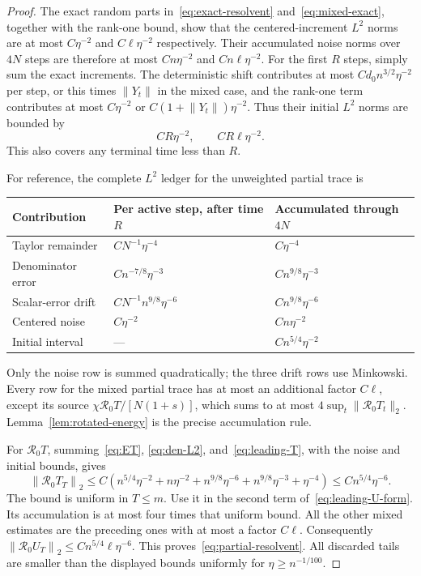 \documentclass[11pt]{article}
\theoremstyle{definition}\newtheorem{definition}[theorem]{Definition}
\theoremstyle{remark}\newtheorem{remark}[theorem]{Remark}
\newcommand{\R}{\mathcal R}
\newcommand{\norm}[1]{\left\lVert#1\right\rVert}
\begin{document}
\begin{proof}
The exact random parts in~\eqref{eq:exact-resolvent} and~\eqref{eq:mixed-exact}, together with the rank-one bound, show that the centered-increment $L^2$ norms are at most
$C\eta^{-2}$ and $C\ell\eta^{-2}$ respectively. Their accumulated noise norms over $4N$ steps are therefore at most $Cn\eta^{-2}$ and $Cn\ell\eta^{-2}$.
For the first $R$ steps, simply sum the exact increments. The deterministic shift contributes at most $C d_0n^{3/2}\eta^{-2}$ per step, or this times $\norm{Y_t}$ in the mixed case, and the rank-one term contributes at most $C\eta^{-2}$ or $C(1+\norm{Y_t})\eta^{-2}$. Thus their initial $L^2$ norms are bounded by
\begin{equation}\label{eq:initial-matrix}
 CR\eta^{-2},\qquad CR\ell\eta^{-2}.
\end{equation}
This also covers any terminal time less than $R$.


For reference, the complete $L^2$ ledger for the unweighted partial trace is
\begin{center}
\small
\begin{tabular}{p{}p{}p{}}
\toprule
Contribution & Per active step, after time $R$ & Accumulated through $4N$\\
\midrule
Taylor remainder & $CN^{-1}\eta^{-4}$ & $C\eta^{-4}$\\
Denominator error & $Cn^{-7/8}\eta^{-3}$ & $Cn^{9/8}\eta^{-3}$\\
Scalar-error drift & $CN^{-1}n^{9/8}\eta^{-6}$ & $Cn^{9/8}\eta^{-6}$\\
Centered noise & $C\eta^{-2}$ & $Cn\eta^{-2}$\\
Initial interval & --- & $Cn^{5/4}\eta^{-2}$\\
\bottomrule
\end{tabular}
\end{center}
Only the noise row is summed quadratically; the three drift rows use Minkowski. Every row for the mixed partial trace has at most an additional factor $C\ell$, except its source $\chi\R_0T/[N(1+s)]$, which sums to at most $4\sup_t\|\R_0T_t\|_2$. Lemma~\ref{lem:rotated-energy} is the precise accumulation rule.

For $\R_0T$, summing~\eqref{eq:ET}, \eqref{eq:den-L2}, and~\eqref{eq:leading-T}, with the noise and initial bounds, gives
\[
 \norm{\R_0T_T}_2\le C\left(
 n^{5/4}\eta^{-2}+n\eta^{-2}
 +n^{9/8}\eta^{-6}+n^{9/8}\eta^{-3}+\eta^{-4}\right)
 \le Cn^{5/4}\eta^{-6}.
\]
The bound is uniform in $T\le m$. Use it in the second term of~\eqref{eq:leading-U-form}. Its accumulation is at most four times that uniform bound. All the other mixed estimates are the preceding ones with at most a factor $C\ell$. Consequently
$\norm{\R_0U_T}_2\le Cn^{5/4}\ell\eta^{-6}$.
This proves~\eqref{eq:partial-resolvent}. All discarded tails are smaller than the displayed bounds uniformly for $\eta\ge n^{-1/100}$.
\end{proof}
\end{document}
